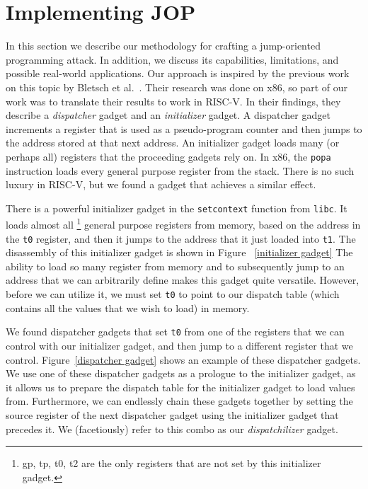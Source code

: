 \section{Implementing JOP}

In this section we describe our methodology for crafting a jump-oriented
programming attack. In addition, we discuss its capabilities, limitations, and
possible real-world applications. Our approach is inspired by the previous work
on this topic by Bletsch et al.~\cite{bletsch11jopx86}. Their research was done
on x86, so part of our work was to translate their results to work in RISC-V. In
their findings, they describe a \textit{dispatcher} gadget and an
\textit{initializer} gadget. A dispatcher gadget increments a register that is
used as a pseudo-program counter and then jumps to the address stored at that
next address. An initializer gadget loads many (or perhaps all) registers that
the proceeding gadgets rely on. In x86, the \verb|popa| instruction loads every
general purpose register from the stack. There is no such luxury in RISC-V, but
we found a gadget that achieves a similar effect.

There is a powerful initializer gadget in the \verb|setcontext| function from
\verb|libc|. It loads almost all%
\footnote{gp, tp, t0, t2 are the only registers that are not set by this
initializer gadget.}
general purpose registers from memory, based on the address in the \verb|t0|
register, and then it jumps to the address that it just loaded into \verb|t1|.
The disassembly of this initializer gadget is shown in Figure~%
\ref{initializer gadget} The ability to load so many register from memory and
to subsequently jump to an address that we can arbitrarily define makes this
gadget quite versatile. However, before we can utilize it, we must set \verb|t0|
to point to our dispatch table (which contains all the values that we wish to
load) in memory.

We found dispatcher gadgets that set \verb|t0| from one of the registers that we
can control with our initializer gadget, and then jump to a different register
that we control. Figure~\ref{dispatcher gadget} shows an example of these
dispatcher gadgets. We use one of these dispatcher gadgets as a prologue to the
initializer gadget, as it allows us to prepare the dispatch table for the
initializer gadget to load values from. Furthermore, we can endlessly chain
these gadgets together by setting the source register of the next dispatcher
gadget using the initializer gadget that precedes it. We (facetiously) refer to
this combo as our \textit{dispatchilizer} gadget.

